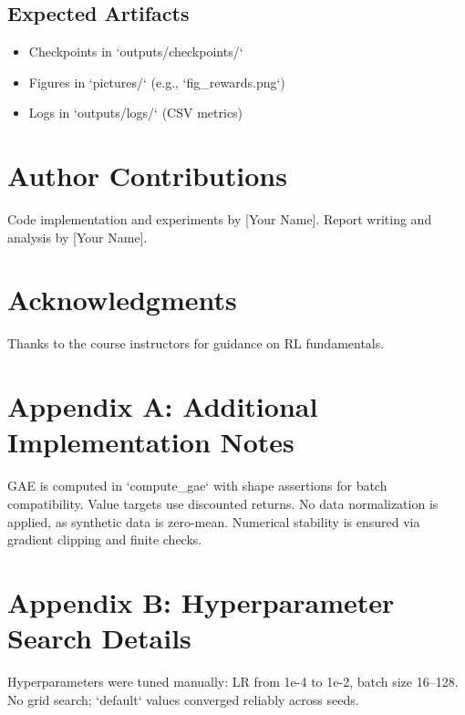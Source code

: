 \documentclass[11pt]{article}
\begin{document}
\subsection{Expected Artifacts}
\begin{itemize}
  \item Checkpoints in `outputs/checkpoints/`
  \item Figures in `pictures/` (e.g., `fig_rewards.png`)
  \item Logs in `outputs/logs/` (CSV metrics)
\end{itemize}

\section*{Author Contributions}
Code implementation and experiments by [Your Name]. Report writing and analysis by [Your Name].

\section*{Acknowledgments}
Thanks to the course instructors for guidance on RL fundamentals.

\appendix
\section{Appendix A: Additional Implementation Notes}
GAE is computed in `compute_gae` with shape assertions for batch compatibility. Value targets use discounted returns. No data normalization is applied, as synthetic data is zero-mean. Numerical stability is ensured via gradient clipping and finite checks.

\section{Appendix B: Hyperparameter Search Details}
Hyperparameters were tuned manually: LR from 1e-4 to 1e-2, batch size 16--128. No grid search; `default` values converged reliably across seeds.



\end{document}
